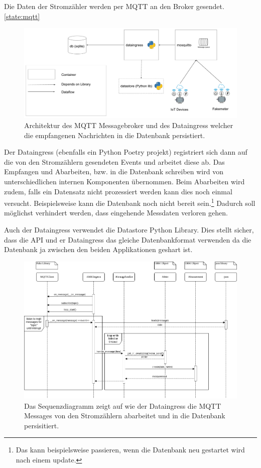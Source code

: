 Die Daten der Stromzähler werden per \ac{MQTT} an den Broker gesendet. \ref{state:mqtt}

\begin{figure}[h]
    \centering
    \includegraphics[width=1.0\textwidth]{gfx/smic-arch-mqtt}
    \caption{
        Architektur des \ac{MQTT} Messagebroker und des Dataingress welcher die
        empfangenen Nachrichten in die Datenbank persistiert.
    }
    \label{fig:arch-mqtt}
\end{figure}

Der Dataingress (ebenfalls ein Python Poetry projekt) registriert sich dann auf die von
den Stromzählern gesendeten Events und arbeitet diese ab. Das Empfangen und Abarbeiten, bzw.
in die Datenbank schreiben wird von unterschiedlichen internen Komponenten übernommen.
Beim Abarbeiten wird zudem, falls ein Datensatz nicht prozessiert werden kann dies noch
einmal versucht. Beispielsweise kann die Datenbank noch nicht bereit sein.\footnote{
    Das kann beispielsweise passieren, wenn die Datenbank neu gestartet wird nach einem update.
}
Dadurch soll möglichst verhindert werden, dass eingehende Messdaten verloren gehen.

Auch der Dataingress verwendet die Datastore Python Library. Dies stellt sicher,
dass die \ac{API} und er Dataingress das gleiche Datenbankformat verwenden da
die Datenbank ja zwischen den beiden Applikationen geshart ist.

\begin{figure}[h]
    \centering
    \includegraphics[width=1.0\textwidth]{gfx/dataingress-sequence}
    \caption{
        Das Sequenzdiagramm zeigt auf wie der Dataingress die \ac{MQTT} Messages
        von den Stromzählern abarbeitet und in die Datenbank persisitiert.
    }
    \label{fig:dataingress-sequence}
\end{figure}

